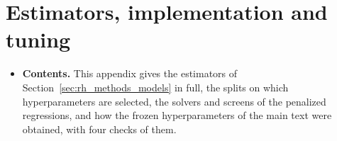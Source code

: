 \section{Estimators, implementation and tuning}
\label{app:rh_methods}
\begin{itemize}
\item \textbf{Contents.} This appendix gives the estimators of Section~\ref{sec:rh_methods_models} in full, the
  splits on which hyperparameters are selected, the solvers and screens of the penalized regressions, and how the
  frozen hyperparameters of the main text were obtained, with four checks of them.
\end{itemize}

